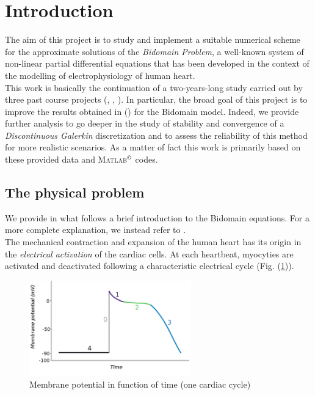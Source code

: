 \documentclass[a4paper,11pt]{article}
\begin{document}
    \section{Introduction}
    The aim of this project is to study and implement a suitable numerical scheme for the approximate solutions of the \emph{Bidomain Problem}, a well-known system of non-linear partial differential equations that has been developed in the context of the modelling of electrophysiology of human heart. \\
    This work is basically the continuation of a two-years-long study carried out by three past course projects (\cite{bagnara}, \cite{andreotti}, \cite{marta}). In particular, the broad goal of this project is to improve the results obtained in \parencite{marta} (\citeauthor{marta}) for the Bidomain model. Indeed, we provide further analysis to go deeper in the study of stability and convergence of a \emph{Discontinuous Galerkin} discretization and to assess the reliability of this method for more realistic scenarios. As a matter of fact this work is primarily based on these provided data and \textsc{Matlab}$^ \copyright$ codes.
    
    \subsection{The physical problem}
    We provide in what follows a brief introduction to the Bidomain equations. For a more complete explanation, we instead refer to \cite{acta}.\\
    The mechanical contraction and expansion of the human heart has its origin in the \emph{electrical activation} of the cardiac cells. At each heartbeat, myocyties are activated and deactivated following a characteristic electrical cycle (Fig. (\ref{potential_cycle})). 
    
    
    \begin{figure}[h]
    \begin{center}
    \includegraphics[width = 7cm]{./potential_cycle.png}
    \caption{Membrane potential in function of time (one cardiac cycle)}
    \label{potential_cycle}
    \end{center}
    \end{figure}
    
\end{document}
